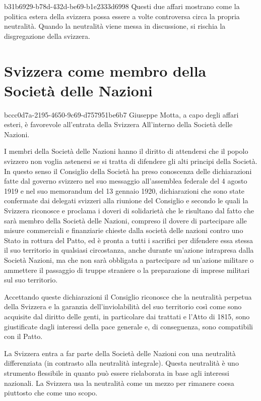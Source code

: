 \documentclass[preview]{standalone}
\begin{document}
\begin{snippet}{b31b6929-b78d-432d-be69-b1e2333d6998}
    Questi due affari mostrano come la politica estera della svizzera possa essere a volte controversa circa
    la propria neutralità.
    Quando la neutralità viene messa in discussione, si rischia la disgregazione della svizzera.
\end{snippet}

\section{Svizzera come membro della Società delle Nazioni}

\begin{snippet}{bccc0d7a-2195-4650-9c69-d757951be6b7}
    Giuseppe Motta, a capo degli affari esteri, è favorevole all'entrata della Svizzera
    All'interno della Società delle Nazioni.
    
    I membri della Società delle Nazioni hanno il diritto di attendersi che il popolo
    svizzero non voglia astenersi se si tratta di difendere gli alti principi della Società. In
    questo senso il Consiglio della Società ha preso conoscenza delle dichiarazioni fatte
    dal governo svizzero nel suo messaggio all'assemblea federale del 4 agosto 1919 e
    nel suo memorandum del 13 gennaio 1920, dichiarazioni che sono state confermate
    dai delegati svizzeri alla riunione del Consiglio e secondo le quali la Svizzera
    riconosce e proclama i doveri di solidarietà che le risultano dal fatto che sarà membro
    della Società delle Nazioni, compreso il dovere di partecipare alle misure
    commerciali e finanziarie chieste dalla società delle nazioni contro uno Stato in
    rottura del Patto, ed è pronta a tutti i sacrifici per difendere essa stessa il suo
    territorio in qualsiasi circostanza, anche durante un'azione intrapresa dalla Società
    Nazioni, ma che non sarà obbligata a partecipare ad un'azione militare o ammettere
    il passaggio di truppe straniere o la preparazione di imprese militari sul suo
    territorio.
    
    Accettando queste dichiarazioni il Consiglio riconosce che la neutralità perpetua
    della Svizzera e la garanzia dell'inviolabilità del suo territorio così come sono
    acquisite dal diritto delle genti, in particolare dai trattati e l'Atto di 1815, sono
    giustificate dagli interessi della pace generale e, di conseguenza, sono compatibili con
    il Patto.
    
    La Svizzera entra a far parte della Società delle Nazioni con una neutralità differenziata
    (in contrasto alla neutralità integrale).
    Questa neutralità è uno strumento flessibile in quanto può essere rielaborata in base
    agli interessi nazionali. La Svizzera usa la neutralità come un mezzo
    per rimanere coesa piuttosto che come uno scopo.
    

\end{snippet}
\end{document}
